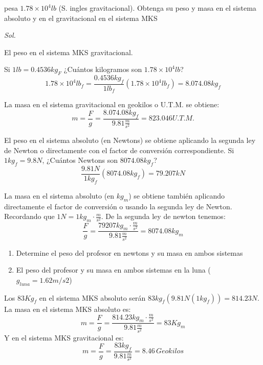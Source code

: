 \begin{problem}
    pesa $1.78\times 10^4lb$ (S. ingles gravitacional). Obtenga su peso y masa en el sistema absoluto y en el gravitacional en el sistema MKS
\end{problem}

\textit{ Sol. }

El peso en el sistema MKS gravitacional.

Si $1lb=0.4536kg_F$ ¿Cuántos kilogramos son $1.78\times 10^4lb$?
\begin{equation*}
    1.78\times 10^4lb_f=\frac{0.4536kg_f}{1lb_f}\left(1.78\times 10^4lb_f\right)=8.074.08kg_f
\end{equation*}

La masa en el sistema gravitacional en geokilos o U.T.M. se obtiene: 
\begin{equation*}
    m=\frac{F}{g}=\frac{8.074.08kg_f}{9.81 \frac{m}{s^2}}=823.046U.T.M.
\end{equation*}

El peso en el sistema absoluto (en Newtons) se obtiene aplicando la segunda ley de Newton o directamente con el factor de conversión correspondiente. 
Si $1kg_f=9.8N$, ¿Cuántos Newtons son $8074.08kg_f$?
\begin{equation*}
    \frac{9.81N}{1kg_f}\left(8074.08kg_f\right)=79.207kN
\end{equation*}

La masa en el sistema absoluto (en $kg_m$) se obtiene también aplicando directamente el factor de conversión o usando la segunda ley de Newton.
Recordando que $1N=1kg_m\cdot \frac{m}{s^2}$. De la segunda ley de newton tenemos: 
\begin{equation*}
    \frac{F}{g}=\frac{79207kg_m\cdot \frac{m}{s^2}}{9.81\frac{m}{s^2}}=8074.08kg_m
\end{equation*}

\begin{problem}
    \begin{enumerate}
        \item Determine el peso del profesor en newtons y su masa en ambos sistemas
        \item El peso del profesor y su masa en ambos sistemas en la luna ($g_{luna}=1.62 m/s2$)
    \end{enumerate}
\end{problem}

Los $83Kg_f$ en el sistema MKS absoluto serán $83kg_f\left(9.81N(1kg_f)\right)=814.23N$.
La masa en el sistema MKS absoluto es: 
\begin{equation*}
    m=\frac{F}{g}=\frac{814.23kg_m\cdot \frac{m}{s^2}}{9.81\frac{m}{s^2}}=83Kg_m
\end{equation*}
Y en el sistema MKS gravitacional es: 
\begin{equation*}
    m=\frac{F}{g}=\frac{83kg_f}{9.81\frac{m}{s^2}}=8.46\, Geokilos
\end{equation*}

